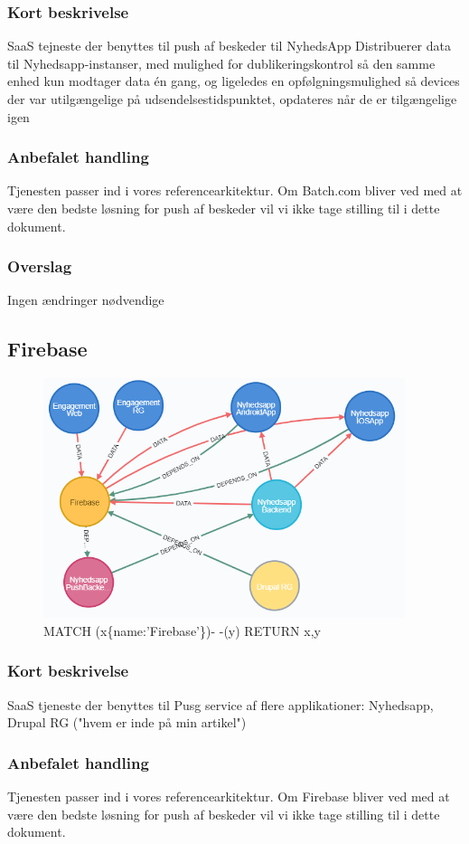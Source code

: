 \documentclass{article}
\begin{document}
\subsubsection{Kort beskrivelse}
SaaS tejneste der benyttes til push af beskeder til NyhedsApp
Distribuerer data til Nyhedsapp-instanser, med mulighed for dublikeringskontrol så den samme enhed kun modtager data én gang, og ligeledes en opfølgningsmulighed så devices der var utilgængelige på udsendelsestidspunktet, opdateres når de er tilgængelige igen
\subsubsection{Anbefalet handling}
Tjenesten passer ind i vores referencearkitektur. Om Batch.com bliver ved med at være den bedste løsning for push af beskeder vil vi ikke tage stilling til i dette dokument.
\subsubsection{Overslag}
Ingen ændringer nødvendige


\subsection{Firebase}
\begin{figure}[h]
\includegraphics[width=300pt]{Firebase.PNG}
\caption{MATCH (x\{name:'Firebase'\})- -(y) RETURN x,y}
\end{figure}
\subsubsection{Kort beskrivelse}
SaaS tjeneste der benyttes til Pusg service af flere applikationer:
Nyhedsapp, Drupal RG ("hvem er inde på min artikel")
\subsubsection{Anbefalet handling}
Tjenesten passer ind i vores referencearkitektur. Om Firebase bliver ved med at være den bedste løsning for push af beskeder vil vi ikke tage stilling til i dette dokument.
\end{document}
